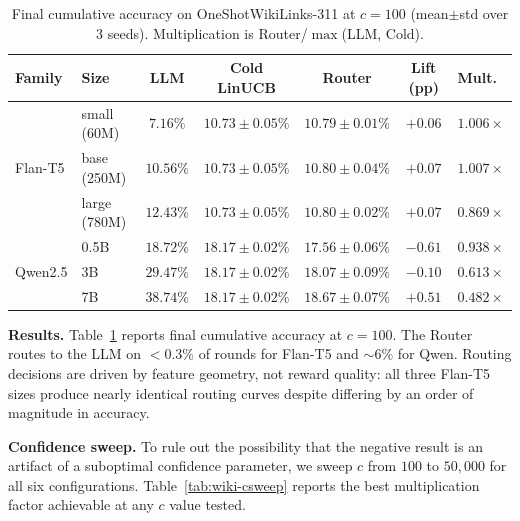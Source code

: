 \documentclass{article}
\theoremstyle{definition}
\theoremstyle{remark}
\theoremstyle{remark}
\begin{document}
\begin{table}[h]
\centering
\caption{Final cumulative accuracy on OneShotWikiLinks-311 at $c=100$
(mean$\pm$std over 3 seeds). Multiplication is Router/$\max$(LLM, Cold).}
\label{tab:wiki-results}
\small
\begin{tabular}{@{}llccccc@{}}
\toprule
Family & Size & LLM & Cold LinUCB & Router & Lift (pp) & Mult.\ \\
\midrule
\multirow{3}{*}{Flan-T5} & small (60M) & $7.16\%$  & $10.73\pm 0.05\%$ & $10.79\pm 0.01\%$ & $+0.06$ & $1.006\times$ \\
& base (250M)   & $10.56\%$ & $10.73\pm 0.05\%$ & $10.80\pm 0.04\%$ & $+0.07$ & $1.007\times$ \\
& large (780M)  & $12.43\%$ & $10.73\pm 0.05\%$ & $10.80\pm 0.02\%$ & $+0.07$ & $0.869\times$ \\
\midrule
\multirow{3}{*}{Qwen2.5} & 0.5B  & $18.72\%$ & $18.17\pm 0.02\%$ & $17.56\pm 0.06\%$ & $-0.61$ & $0.938\times$ \\
& 3B  & $29.47\%$ & $18.17\pm 0.02\%$ & $18.07\pm 0.09\%$ & $-0.10$ & $0.613\times$ \\
& 7B  & $38.74\%$ & $18.17\pm 0.02\%$ & $18.67\pm 0.07\%$ & $+0.51$ & $0.482\times$ \\
\bottomrule
\end{tabular}
\end{table}

\textbf{Results.} Table~\ref{tab:wiki-results} reports final cumulative
accuracy at $c=100$. The Router routes to the LLM on $<0.3\%$ of rounds for
Flan-T5 and $\sim 6\%$ for Qwen. Routing decisions are driven by feature
geometry, not reward quality: all three Flan-T5 sizes produce nearly
identical routing curves despite differing by an order of magnitude in
accuracy.

\textbf{Confidence sweep.}
To rule out the possibility that the negative result is an artifact of a
suboptimal confidence parameter, we sweep $c$ from $100$ to $50{,}000$ for
all six configurations. Table~\ref{tab:wiki-csweep} reports the best
multiplication factor achievable at any $c$ value tested.
\end{document}
